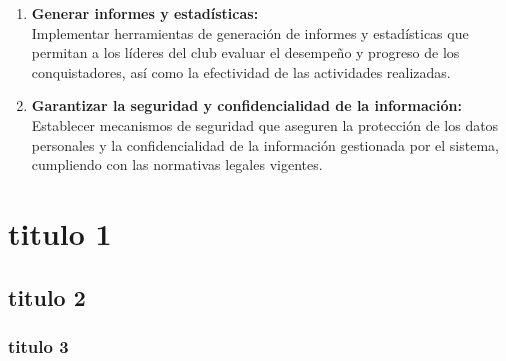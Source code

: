 \documentclass[stu, 12pt, letterpaper, donotrepeattitle, floatsintext, natbib]{apa7}
\begin{document}
\begin{enumerate}
        \item\textbf{Generar informes y estad\'isticas:}\\Implementar herramientas de generaci\'on de informes y estad\'isticas que permitan a los l\'ideres del club evaluar el desempe\~{n}o y progreso de los conquistadores, as\'i como la efectividad de las actividades realizadas.
        \item\textbf{Garantizar la seguridad y confidencialidad de la informaci\'on:}\\Establecer mecanismos de seguridad que aseguren la protecci\'on de los datos personales y la confidencialidad de la informaci\'on gestionada por el sistema, cumpliendo con las normativas legales vigentes.
    \end{enumerate}

    \section{titulo 1}

    \subsection{titulo 2}

    \subsubsection{titulo 3}
\end{document}
